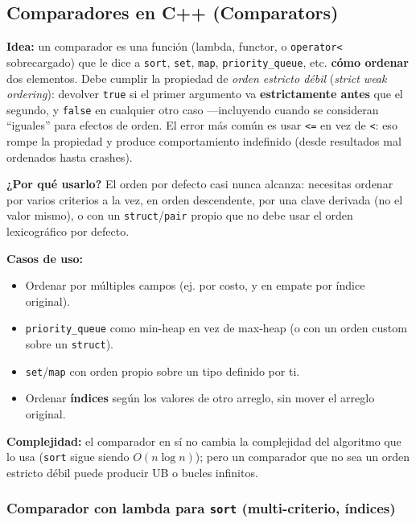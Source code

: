 \documentclass[10pt,a4paper,twocolumn]{article}
\begin{document}
\subsection{Comparadores en C++ (Comparators)}

\textbf{Idea:} un comparador es una función (lambda, functor, o
\texttt{operator<} sobrecargado) que le dice a \texttt{sort},
\texttt{set}, \texttt{map}, \texttt{priority\_queue}, etc.
\textbf{cómo ordenar} dos elementos. Debe cumplir la propiedad de
\emph{orden estricto débil} (\textit{strict weak ordering}):
devolver \texttt{true} si el primer argumento va
\textbf{estrictamente antes} que el segundo, y \texttt{false} en
cualquier otro caso —incluyendo cuando se consideran ``iguales'' para
efectos de orden. El error más común es usar \texttt{<=} en vez de
\texttt{<}: eso rompe la propiedad y produce comportamiento
indefinido (desde resultados mal ordenados hasta crashes).

\textbf{¿Por qué usarlo?} El orden por defecto casi nunca alcanza:
necesitas ordenar por varios criterios a la vez, en orden
descendente, por una clave derivada (no el valor mismo), o con un
\texttt{struct}/\texttt{pair} propio que no debe usar el orden
lexicográfico por defecto.

\textbf{Casos de uso:}

\begin{itemize}
    \item Ordenar por múltiples campos (ej. por costo, y en empate
    por índice original).
    \item \texttt{priority\_queue} como min-heap en vez de max-heap
    (o con un orden custom sobre un \texttt{struct}).
    \item \texttt{set}/\texttt{map} con orden propio sobre un tipo
    definido por ti.
    \item Ordenar \textbf{índices} según los valores de otro
    arreglo, sin mover el arreglo original.
\end{itemize}

\textbf{Complejidad:} el comparador en sí no cambia la complejidad
del algoritmo que lo usa (\texttt{sort} sigue siendo
$O(n\log n)$); pero un comparador que no sea un orden estricto débil
puede producir UB o bucles infinitos.


\subsubsection{Comparador con lambda para \texttt{sort} (multi-criterio, índices)}
\end{document}
